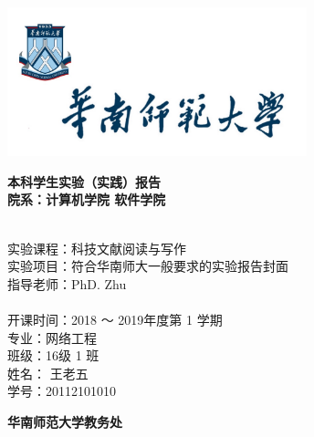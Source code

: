 \documentclass[10.5pt,a4paper,headings]{ctexart}
\newcommand{\titleline}[1]{\hspace*{6em} #1 \\}
\begin{document}
\begin{titlepage}
\scshape


\begin{center}
\vspace*{0.6cm}
\includegraphics[width=0.65\textwidth]{./logo.jpg}

\doublespacing
\fontsize{18pt}{2em}\bf 
本科学生实验（实践）报告\\
\vspace{1em}
院系：计算机学院 
\hspace{2ex}
软件学院
\end{center}

\begin{flushleft}

\setlength{\parindent}{2em}
\bf
{\fontsize{14pt}{18pt}

\linespread{1.5}\selectfont
~\\
\titleline{实验课程：科技文献阅读与写作}

\titleline{实验项目：符合华南师大一般要求的实验报告封面}

\titleline{指导老师：PhD. Zhu}
~\\
\titleline{开课时间：2018 ～ 2019年度第 1 学期}

\titleline{专\hspace{2em}业：网络工程}

\titleline{班\hspace{2em}级：16级 1 班}

\titleline{姓\hspace{2em}名： 王老五}

\titleline{学\hspace{2em}号：20112101010}
}
\end{flushleft}

\begin{center}
\vspace{3cm}
\fontsize{14pt}{21pt}
\bf 华南师范大学教务处
\end{center}

\end{titlepage}
\end{document}
